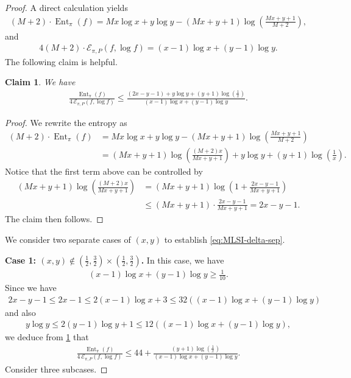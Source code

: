 \documentclass[11pt]{article}
\def\cE{\mathcal{E}}
\DeclareMathOperator\Ent{\mathrm{Ent}}
\newtheorem{claim}[theorem]{Claim}
\theoremstyle{definition}
\begin{document}
\begin{proof}
A direct calculation yields
\begin{align}
(M+2) \cdot \Ent_\pi(f) = Mx \log x + y \log y - (Mx + y + 1) \log\left( \frac{Mx + y + 1}{M+2} \right),
\end{align}
and
\begin{align}
4(M+2) \cdot \cE_{\pi,P}(f,\log f) = (x-1)\log x + (y-1) \log y.
\end{align}
The following claim is helpful.
\begin{claim}\label{claim:ex-three-state-delta-vs-rho0:ratio}
We have
\begin{align}
\frac{\Ent_\pi(f)}{4\, \cE_{\pi,P}(f,\log f)}
\le \frac{(2x - y - 1) + y\log y + (y+1) \log\left( \frac{1}{x} \right)}{(x-1)\log x + (y-1) \log y}.
\end{align}
\end{claim}
\begin{proof}
We rewrite the entropy as
\begin{align}
(M+2) \cdot \Ent_\pi(f) &= Mx \log x + y \log y - (Mx + y + 1) \log\left( \frac{Mx + y + 1}{M+2} \right) \\
\nonumber &= (Mx + y + 1) \log\left( \frac{(M+2)x}{Mx + y + 1} \right) + y\log y + (y+1) \log\left( \frac{1}{x} \right).
\end{align}
Notice that the first term above can be controlled by
\begin{align}
(Mx + y + 1) \log\left( \frac{(M+2)x}{Mx + y + 1} \right)
&= (Mx + y + 1) \log\left( 1 + \frac{2x - y - 1}{Mx + y + 1} \right) \\
\nonumber &\le (Mx + y + 1) \cdot \frac{2x - y - 1}{Mx + y + 1}
= 2x - y - 1.
\end{align}
The claim then follows.
\end{proof}

We consider two separate cases of $(x,y)$ to establish \cref{eq:MLSI-delta-sep}.

\textbf{Case 1: $(x,y) \notin (\frac{1}{2},\frac{3}{2}) \times (\frac{1}{2},\frac{3}{2})$.}
In this case,
we have
\begin{align}
(x-1)\log x + (y-1) \log y \ge \frac{1}{10}.
\end{align}
Since we have
\begin{align}
2x - y - 1 \le 2x-1
\le 2(x-1)\log x + 3
\le 32 \left( (x-1)\log x + (y-1) \log y \right)
\end{align}
and also
\begin{align}
y\log y \le 2(y-1) \log y + 1 \le 12 \left( (x-1)\log x + (y-1) \log y \right),
\end{align}
we deduce from \cref{claim:ex-three-state-delta-vs-rho0:ratio} that
\begin{align}
\frac{\Ent_\pi(f)}{4\, \cE_{\pi,P}(f,\log f)}
\le 44 + \frac{(y+1) \log\left( \frac{1}{x} \right)}{(x-1)\log x + (y-1) \log y}.
\end{align}
Consider three subcases.


\end{proof}
\end{document}
